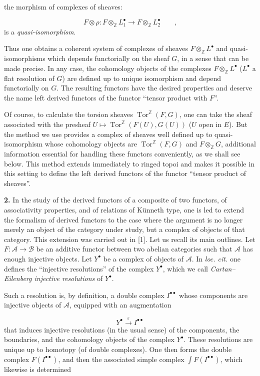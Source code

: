 the morphism of complexes of sheaves:

\[
F\otimes\rho:
F\otimes_{\mathbb Z}L_1^{\bullet}
\longrightarrow
F\otimes_{\mathbb Z}L_2^{\bullet}
\qquad\text{,}
\]
is a \emph{quasi-isomorphism}.

Thus one obtains a coherent system of complexes of sheaves
$F\otimes_{\mathbb Z}L^{\bullet}$ and quasi-isomorphisms which depends
functorially on the sheaf $G$, in a sense that can be made precise. In any
case, the cohomology objects of the complexes
$F\otimes_{\mathbb Z}L^{\bullet}$ ($L^{\bullet}$ a flat resolution of $G$) are
defined up to unique isomorphism and depend functorially on $G$. The resulting
functors have the desired properties and deserve the name left derived
functors of the functor ``tensor product with $F$''.

Of course, to calculate the torsion sheaves
$\operatorname{Tor}^{\mathbb Z}(F,G)$, one can take the sheaf associated with
the presheaf
$U\longmapsto\operatorname{Tor}^{\mathbb Z}(F(U),G(U))$ ($U$ open in $E$).
But the method we use provides a complex of sheaves well defined up to
quasi-isomorphism whose cohomology objects are
$\operatorname{Tor}^{\mathbb Z}(F,G)$ and $F\otimes_{\mathbb Z}G$, additional
information essential for handling these functors conveniently, as we shall
see below. This method extends immediately to ringed topoi and makes it
possible in this setting to define the left derived functors of the functor
``tensor product of sheaves''.

\noindent\textbf{2.}\quad
In the study of the derived functors of a composite of two functors, of
associativity properties, and of relations of Künneth type, one is led to
extend the formalism of derived functors to the case where the argument is no
longer merely an object of the category under study, but a complex of objects
of that category. This extension was carried out in [1]. Let us recall its
main outlines. Let $F:\mathcal A\to\mathcal B$ be an additive functor between
two abelian categories such that $\mathcal A$ has enough injective objects.
Let $Y^{\bullet}$ be a complex of objects of $\mathcal A$. In \emph{loc. cit.}
one defines the ``injective resolutions'' of the complex $Y^{\bullet}$, which
we call \emph{Cartan--Eilenberg injective resolutions} of $Y^{\bullet}$.

Such a resolution is, by definition, a double complex
$I^{\bullet\bullet}$ whose components are injective objects of $\mathcal A$,
equipped with an augmentation

\[
Y^{\bullet}\xrightarrow{\varepsilon}I^{\bullet\bullet}
\]
that induces injective resolutions (in the usual sense) of the components,
the boundaries, and the cohomology objects of the complex $Y^{\bullet}$. These
resolutions are unique up to homotopy (of double complexes). One then forms
the double complex $F(I^{\bullet\bullet})$, and then the associated simple
complex $\int F(I^{\bullet\bullet})$, which likewise is determined
